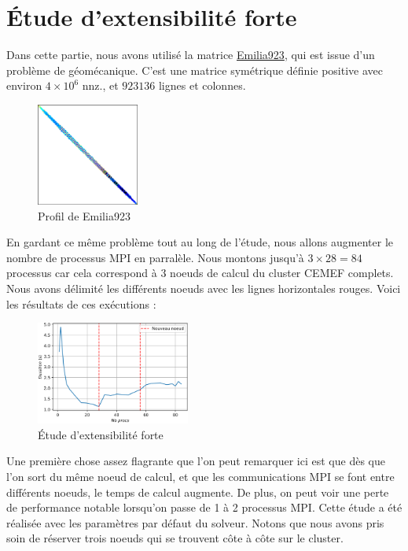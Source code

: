 \documentclass[10pt,twocolumn,letterpaper]{article}
\begin{document}
\section{Étude d'extensibilité forte}

Dans cette partie, nous avons utilisé la matrice
\href{https://sparse.tamu.edu/Janna/Emilia_923}{Emilia923}, qui est issue d'un
problème de géomécanique. C'est une matrice symétrique définie positive avec
environ $4\times 10^6$ nnz., et $923136$ lignes et colonnes.

\begin{figure}[H]
  \centering
  \caption{Profil de Emilia923}
  \includegraphics[width=0.3\textwidth]{fig/Emilia923.png}
\end{figure}

En gardant ce même problème tout au long de l'étude, nous allons augmenter
le nombre de processus MPI en parralèle. Nous montons jusqu'à $3 \times 28 = 84$
processus car cela correspond à $3$ noeuds de calcul du cluster CEMEF complets.
Nous avons délimité les différents noeuds avec les lignes horizontales rouges.
Voici les résultats de ces exécutions :

\begin{figure}[H]
    \centering
    \caption{Étude d'extensibilité forte}
    \includegraphics[width=0.45\textwidth]{fig/strong_scalab.png}
  \end{figure}

Une première chose assez flagrante que l'on peut remarquer ici est que dès que
l'on sort du même noeud de calcul, et que les communications MPI se font entre
différents noeuds, le temps de calcul augmente.
De plus, on peut voir une perte de performance notable lorsqu'on passe de 1 à 2
processus MPI. Cette étude a été réalisée avec les paramètres par défaut du
solveur.
Notons que nous avons pris soin de
réserver trois noeuds qui se trouvent côte à côte sur le cluster.
\end{document}
